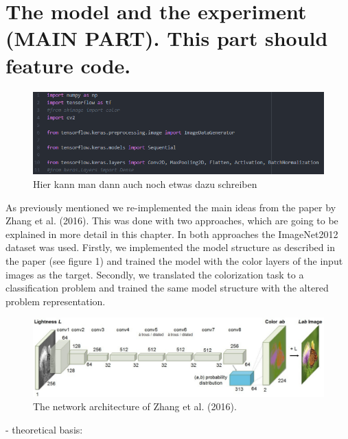 \documentclass[12pt,letterpaper]{article}
\begin{document}
\section{The model and the experiment (MAIN PART). This part should feature code.}
\begin{figure}[ht]
	\centering
	\includegraphics[width=1.0\textwidth]{bsp.png}
	\caption{Hier kann man dann auch noch etwas dazu schreiben}
	\label{bsp}
\end{figure}
As previously mentioned we re-implemented the main ideas from the paper by Zhang et al. (2016). This was done with two approaches, which are going to be explained in more detail in this chapter. In both approaches the ImageNet2012 dataset was used. Firstly, we implemented the model structure as described in the paper (see figure 1) and trained the model with the color layers of the input images as the target. Secondly, we translated the colorization task to a classification problem and trained the same model structure with the altered problem representation.
\begin{figure}[ht]
	\centering
	\includegraphics[width=1.0\textwidth]{layer.png}
	\caption{The network architecture of Zhang et al. (2016). }
	\label{fig1}
\end{figure}
- theoretical basis:\\
\end{document}
